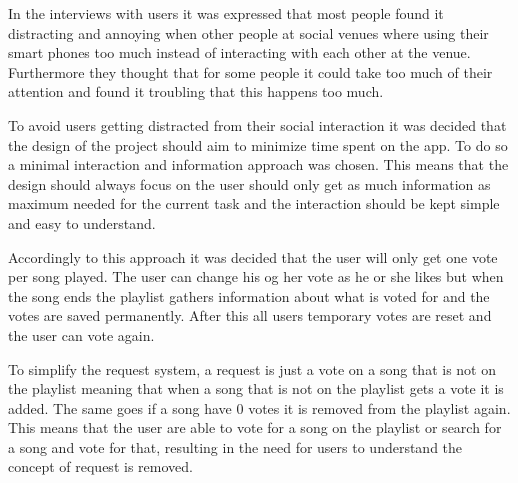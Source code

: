In the interviews with users it was expressed that most people found it distracting and annoying when other people at social venues where using their smart phones too much instead of interacting with each other at the venue. Furthermore they thought that for some people it could take too much of their attention and found it troubling that this happens too much.

To avoid users getting distracted from their social interaction it was decided that the design of the project should aim to minimize time spent on the app. To do so a minimal interaction and information approach was chosen. This means that the design should always focus on the user should only get as much information as maximum needed for the current task and the interaction should be kept simple and easy to understand.

Accordingly to this approach it was decided that the user will only get one vote per song played. The user can change his og her vote as he or she likes but when the song ends the playlist gathers information about what is voted for and the votes are saved permanently. After this all users temporary votes are reset and the user can vote again.

To simplify the request system, a request is just a vote on a song that is not on the playlist meaning that when a song that is not on the playlist gets a vote it is added. The same goes if a song have 0 votes it is removed from the playlist again. This means that the user are able to vote for a song on the playlist or search for a song and vote for that, resulting in the need for users to understand the concept of request is removed.